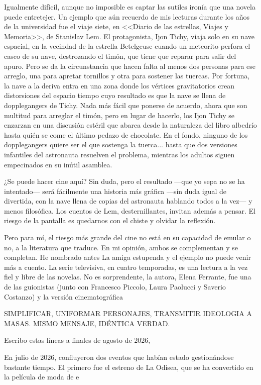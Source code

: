 Igualmente difícil, aunque no imposible es captar las sutiles ironía que una novela puede entretejer. Un ejemplo que aún recuerdo de mis lecturas durante los años de la universidad fue el viaje siete, en <<Diario de las estrellas, Viajes y Memoria>>, de Stanislav Lem. El protagonista, Ijon Tichy, viaja solo en su nave espacial, en la vecindad de la estrella 
Betelgeuse cuando un meteorito perfora el casco de su nave, destrozando el timón, que tiene que reparar para salir del apuro. Pero se da la circunstancia que hacen falta al menos dos personas para ese arreglo, una para apretar tornillos y otra para sostener las tuercas. Por fortuna, la nave a la deriva entra en una zona donde los vértices gravitatorios crean distorsiones del espacio tiempo cuyo resultado es que la nave se llena de dopplegangers de Tichy. Nada más fácil que ponerse de acuerdo, ahora que son multitud para arreglar el timón, pero en lugar de hacerlo, los Ijon Tichy se enzarzan en una discusión estéril que abarca desde la naturaleza del libro albedrío hasta quién se come el último pedazo de chocolate. En el fondo, ninguno de los dopplegangers quiere ser el que sostenga la tuerca... hasta que dos versiones infantiles del astronauta resuelven el problema, mientras los adultos siguen empecinados en su inútil asamblea. 

¿Se puede hacer cine aquí? Sin duda, pero el resultado ---que yo sepa no se ha intentado--- será fácilmente una historia más gráfica ---sin duda igual de divertida, con la nave llena de copias del astronauta hablando todos a la vez--- y menos filosófica. Los cuentos de Lem, desternillantes, invitan además a pensar. El riesgo de la pantalla es quedarnos con el chiste y olvidar la reflexión. 

Pero para mí, el riesgo más grande del cine no está en su capacidad de emular o no, a la literatura que traduce. En mi opinión, ambos se complementan y se completan. He nombrado antes La amiga estupenda y el ejemplo no puede venir más a cuento. La serie televisiva, en cuatro temporadas, es una lectura a la vez fiel y libre de las novelas. No es sorprendente, la autora, Elena Ferrante, fue una de las guionistas (junto con Francesco Piccolo, Laura Paolucci y Saverio Costanzo) y la versión cinematográfica 



SIMPLIFICAR, UNIFORMAR PERSONAJES, TRANSMITIR IDEOLOGIA A MASAS. MISMO MENSAJE, IDÉNTICA VERDAD. 


 Escribo estas líneas a finales de agosto de 2026, 

En julio de 2026, confluyeron dos eventos que habían estado gestionándose bastante tiempo. El primero fue el estreno de La Odisea, que se ha convertido en la película de moda de e